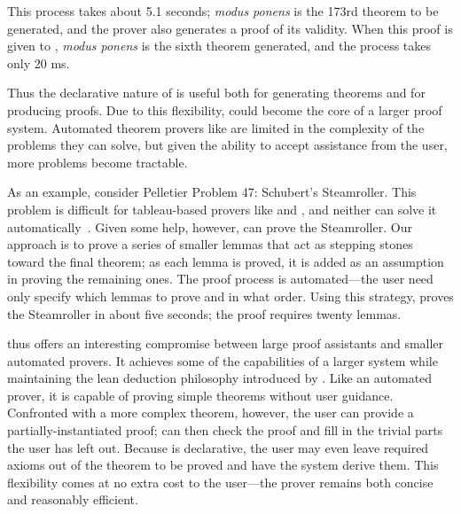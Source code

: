 \smallskip

\noindent This process takes about 5.1 seconds; {\it modus ponens} is the
173rd theorem to be generated, and the prover also generates a proof
of its validity. When this proof is given to \alphatap, {\it modus ponens}
is the sixth theorem generated, and the process takes only 20 ms.

Thus the declarative nature of \alphatapsp is useful both for
generating theorems and for producing proofs. Due to this flexibility,
\alphatapsp could become the core of a larger proof system.  Automated
theorem provers like \leantapsp are limited in the complexity of the
problems they can solve, but given the ability to accept assistance
from the user, more problems become tractable.




As an example, consider Pelletier Problem 47: Schubert's Steamroller.
This problem is difficult for tableau-based provers like \leantapsp
and \alphatap, and neither can solve it
automatically~\cite{beckert95leantap}.  Given some help, however,
\alphatapsp can prove the Steamroller. Our approach is to prove a
series of smaller lemmas that act as stepping stones toward the final
theorem; as each lemma is proved, it is added as an assumption in
proving the remaining ones.  The proof process is automated---the user
need only specify which lemmas to prove and in what order. Using this
strategy, \alphatapsp proves the Steamroller in about five seconds;
the proof requires twenty lemmas.


\alphatapsp thus offers an interesting compromise between large proof
assistants and smaller automated provers. It achieves some of the
capabilities of a larger system while maintaining the lean deduction
philosophy introduced by \leantap. Like an automated prover, it is
capable of proving simple theorems without user guidance. Confronted
with a more complex theorem, however, the user can provide a
partially-instantiated proof; \alphatapsp can then check the proof and
fill in the trivial parts the user has left out.  Because \alphatapsp
is declarative, the user may even leave required axioms out of the
theorem to be proved and have the system derive them. This flexibility
comes at no extra cost to the user---the prover remains both concise
and reasonably efficient.


